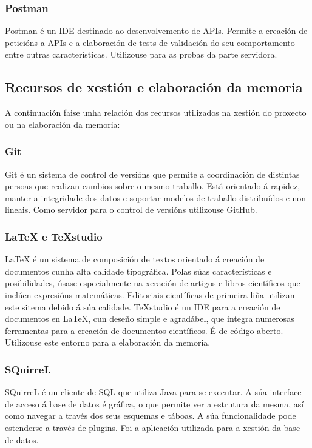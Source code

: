 \subsubsection{Postman}
Postman é un IDE destinado ao desenvolvemento de APIs. Permite a creación de peticións a APIs e a elaboración de tests de validación do seu comportamento entre outras características. Utilizouse para as probas da parte servidora.


\subsection{Recursos de xestión e elaboración da memoria}
A continuación faise unha relación dos recursos utilizados na xestión do proxecto ou na elaboración da memoria:

\subsubsection{Git}
Git é un sistema de control de versións que permite a coordinación de distintas persoas que realizan cambios sobre o mesmo traballo. Está orientado á rapidez, manter a integridade dos datos e soportar modelos de traballo distribuídos e non lineais. Como servidor para o control de versións utilizouse GitHub.


\subsubsection{LaTeX e TeXstudio}
LaTeX é un sistema de composición de textos orientado á creación de documentos cunha alta calidade tipográfica. Polas súas características e posibilidades, úsase especialmente na xeración de artigos e libros científicos que inclúen expresións matemáticas. Editoriais científicas de primeira liña utilizan este sitema debido á súa calidade.
TeXstudio é un IDE para a creación de documentos en LaTeX, cun deseño simple e agradábel, que integra numerosas ferramentas para a creación de documentos científicos. É de código aberto. Utilizouse este entorno para a elaboración da memoria.


\subsubsection{SQuirreL}
SQuirreL é un cliente de SQL que utiliza Java para se executar. A súa interface de acceso á base de datos é gráfica, o que permite ver a estrutura da mesma, así como navegar a través dos seus esquemas e táboas. A súa funcionalidade pode estenderse a través de plugins. Foi a aplicación utilizada para a xestión da base de datos.


